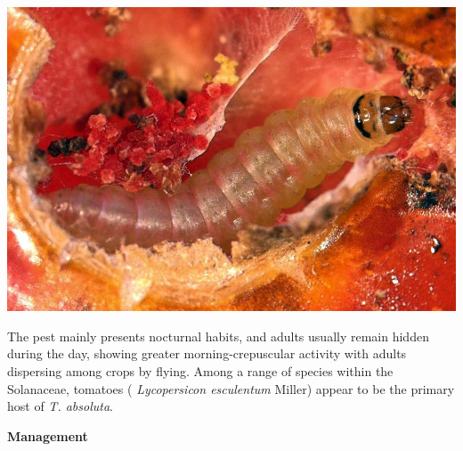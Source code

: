 \documentclass[
  openany]{book}
\begin{document}
\begin{center}\includegraphics[width=0.8\linewidth]{./images/tuta_absoluta} \end{center}

The pest mainly presents nocturnal habits, and adults usually remain hidden during the day, showing greater morning-crepuscular activity with adults dispersing among crops by flying. Among a range of species within the Solanaceae, tomatoes ( \emph{Lycopersicon esculentum} Miller) appear to be the primary host of \emph{T. absoluta}.

\textbf{Management}
\end{document}
